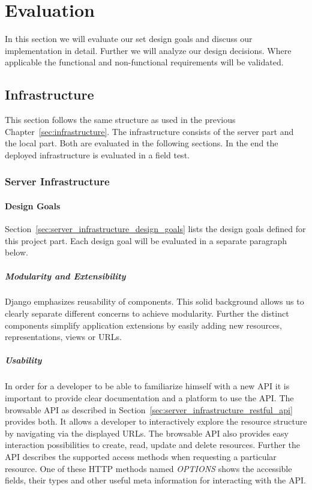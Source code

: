 
\chapter{Evaluation}
\label{sec:evaluation}

In this section we will evaluate our set design goals and discuss our implementation in detail.
Further we will analyze our design decisions.
Where applicable the functional and non-functional requirements will be validated.

\section{Infrastructure}

This section follows the same structure as used in the previous Chapter~\ref{sec:infrastructure}.
The infrastructure consists of the server part and the local part.
Both are evaluated in the following sections.
In the end the deployed infrastructure is evaluated in a field test.

\subsection{Server Infrastructure}

\subsubsection{Design Goals}

Section~\ref{sec:server_infrastructure_design_goals} lists the design goals defined for this project part.
Each design goal will be evaluated in a separate paragraph below.

\paragraph{Modularity and Extensibility} Django emphasizes reusability of components.
This solid background allows us to clearly separate different concerns to achieve modularity.
Further the distinct components simplify application extensions by easily adding new resources, representations, views or URLs.


\paragraph{Usability} In order for a developer to be able to familiarize himself with a new API it is important to provide clear documentation and a platform to use the API.
The browsable API as described in Section~\ref{sec:server_infrastructure_restful_api} provides both.
It allows a developer to interactively explore the resource structure by navigating via the displayed URLs.
The browsable API also provides easy interaction possibilities to create, read, update and delete resources.
Further the API describes the supported access methods when requesting a particular resource.
One of these HTTP methods named \emph{OPTIONS} shows the accessible fields, their types and other useful meta information for interacting with the API.



